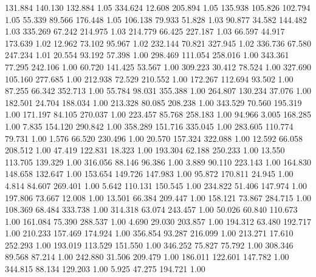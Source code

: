  131.884  140.130  132.884         1.05
 334.624   12.608  205.894         1.05
 135.938  105.826  102.794         1.05
  55.339   89.566  176.448         1.05
 106.138   79.933   51.828         1.03
  90.877   34.582  144.482         1.03
 335.269   67.242  214.975         1.03
 214.779   66.425  227.187         1.03
  66.597   44.917  173.639         1.02
  12.962   73.102   95.967         1.02
 232.144   70.821  327.945         1.02
 336.736   67.580  247.234         1.01
  20.554   93.192   57.398         1.00
 298.469  111.054  258.016         1.00
 343.361   77.295  242.106         1.00
  60.720  141.425   53.567         1.00
 309.223   30.412   78.524         1.00
 327.690  105.160  277.685         1.00
 212.938   72.529  210.552         1.00
 172.267  112.694   93.502         1.00
  87.255   66.342  352.713         1.00
  55.784   98.031  355.388         1.00
 264.807  130.234   37.076         1.00
 182.501   24.704  188.034         1.00
 213.328   80.085  208.238         1.00
 343.529   70.560  195.319         1.00
 171.197   84.105  270.037         1.00
 223.457   85.768  258.183         1.00
  94.966    3.005  168.285         1.00
   7.835  154.120  290.842         1.00
 358.289  151.716  335.045         1.00
 283.605  110.774   79.731         1.00
   1.576   66.520  230.496         1.00
  20.570  157.324  322.088         1.00
  12.592   66.058  208.512         1.00
  47.419  122.831   18.323         1.00
 193.304   62.188  250.233         1.00
  13.550  113.705  139.329         1.00
 316.056   88.146   96.386         1.00
   3.889   90.110  223.143         1.00
 164.830  148.658  132.647         1.00
 153.654  149.726  147.983         1.00
  95.872  170.811   24.945         1.00
   4.814   84.607  269.401         1.00
   5.642  110.131  150.545         1.00
 234.822   51.406  147.974         1.00
 197.806   73.667   12.008         1.00
  13.501   66.384  209.447         1.00
 158.121   73.867  284.715         1.00
 108.369   68.484  333.738         1.00
 314.318   63.074  243.457         1.00
  50.026   60.840  110.673         1.00
 161.084   75.390  288.537         1.00
   4.690   29.030  203.857         1.00
 194.312   63.480  192.717         1.00
 210.233  157.469  174.924         1.00
 356.854   93.287  216.099         1.00
 213.271   17.610  252.293         1.00
 193.019  113.529  151.550         1.00
 346.252   75.827   75.792         1.00
 308.346   89.568   87.214         1.00
 242.880   31.506  209.479         1.00
 186.011  122.601  147.782         1.00
 344.815   88.134  129.203         1.00
   5.925   47.275  194.721         1.00
